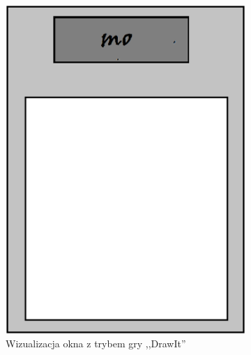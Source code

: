 \documentclass[15pt]{article}
\begin{document}
  \begin{figure}[h!]
    \centering
    \begin{subfigure}[b]{0.35\linewidth}
      \includegraphics[width=\linewidth]{draw.png}
      \caption{Wizualizacja okna z trybem gry ,,DrawIt''}
    \end{subfigure}
    \begin{subfigure}[b]{0.35\linewidth}

\end{subfigure}
\end{figure}
\end{document}
